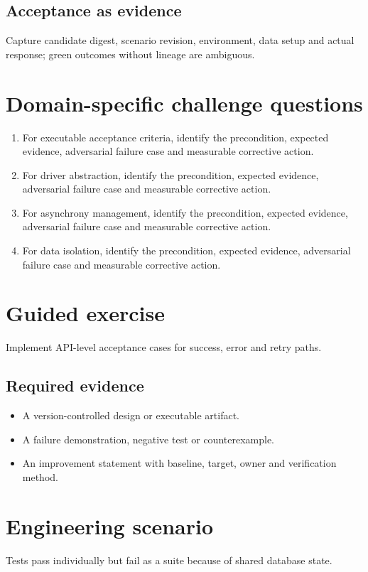 \documentclass[10pt,letterpaper]{article}
\begin{document}
\subsection{Acceptance as evidence}
Capture candidate digest, scenario revision, environment, data setup and actual response; green outcomes without lineage are ambiguous.

\section{Domain-specific challenge questions}
\begin{enumerate}
\item For executable acceptance criteria, identify the precondition, expected evidence, adversarial failure case and measurable corrective action.
\item For driver abstraction, identify the precondition, expected evidence, adversarial failure case and measurable corrective action.
\item For asynchrony management, identify the precondition, expected evidence, adversarial failure case and measurable corrective action.
\item For data isolation, identify the precondition, expected evidence, adversarial failure case and measurable corrective action.
\end{enumerate}
\section{Guided exercise}
Implement API-level acceptance cases for success, error and retry paths.

\subsection{Required evidence}
\begin{itemize}
\item A version-controlled design or executable artifact.
\item A failure demonstration, negative test or counterexample.
\item An improvement statement with baseline, target, owner and verification method.
\end{itemize}


\section{Engineering scenario}
Tests pass individually but fail as a suite because of shared database state.
\end{document}
